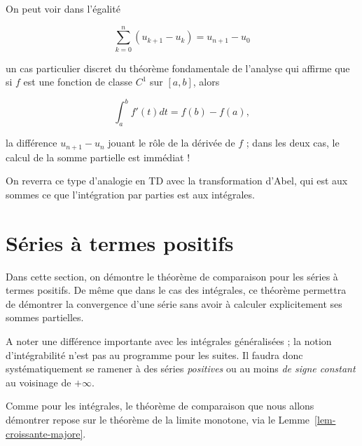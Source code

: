 \documentclass[
  french,
  letterpaper,
  DIV=11,
  numbers=noendperiod]{scrreprt}
\theoremstyle{plain}
\theoremstyle{definition}
\theoremstyle{plain}
\theoremstyle{plain}
\theoremstyle{definition}
\theoremstyle{definition}
\theoremstyle{plain}
\theoremstyle{remark}
\newcounter{quartocalloutnteno}
\newcommand{\quartocalloutnte}[1]{\refstepcounter{quartocalloutnteno}\label{#1}}
\begin{document}
\begin{tcolorbox}[enhanced jigsaw, arc=.35mm, bottomrule=.15mm, bottomtitle=1mm, breakable, colback=white, colbacktitle=quarto-callout-note-color!10!white, colframe=quarto-callout-note-color-frame, coltitle=black, left=2mm, leftrule=.75mm, opacityback=0, opacitybacktitle=0.6, rightrule=.15mm, title=\textcolor{quarto-callout-note-color}{\faInfo}\hspace{0.5em}{Note \ref*{nte-theorem-fondamental-analyse}}, titlerule=0mm, toprule=.15mm, toptitle=1mm]

\quartocalloutnte{nte-theorem-fondamental-analyse} 

On peut voir dans l'égalité

\[
    \sum_{k=0}^{n} (u_{k+1}-u_{k}) = u_{n+1}-u_0
\]

un cas particulier discret du théorème fondamentale de l'analyse qui
affirme que si \(f\) est une fonction de classe \(C^{1}\) sur \([a,b]\),
alors

\[
    \int_{a}^{b}f'(t)dt = f(b)-f(a),
\]

la différence \(u_{n+1}-u_{n}\) jouant le rôle de la dérivée de \(f\) ;
dans les deux cas, le calcul de la somme partielle est immédiat !

On reverra ce type d'analogie en TD avec la transformation d'Abel, qui
est aux sommes ce que l'intégration par parties est aux intégrales.

\end{tcolorbox}

\section{Séries à termes positifs}\label{sec-02-serie-terme-positif}

Dans cette section, on démontre le théorème de comparaison pour les
séries à termes positifs. De même que dans le cas des intégrales, ce
théorème permettra de démontrer la convergence d'une série sans avoir à
calculer explicitement ses sommes partielles.

A noter une différence importante avec les intégrales généralisées ; la
notion d'intégrabilité n'est pas au programme pour les suites. Il faudra
donc systématiquement se ramener à des séries \emph{positives} ou au
moins \emph{de signe constant} au voisinage de \(+\infty\).

Comme pour les intégrales, le théorème de comparaison que nous allons
démontrer repose sur le théorème de la limite monotone, via le
Lemme~\ref{lem-croissante-majore}.
\end{document}
